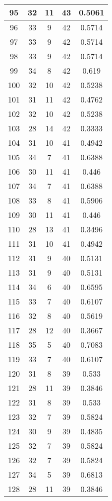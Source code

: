 \documentclass[letterpaper, 12pt]{article}
\begin{document}
\begin{longtable}{|c|c|c|c|c|}
\hline
95 & 32 & 11 & 43 & 0.5061 \\
\hline
96 & 33 & 9 & 42 & 0.5714 \\
\hline
97 & 33 & 9 & 42 & 0.5714 \\
\hline
98 & 33 & 9 & 42 & 0.5714 \\
\hline
99 & 34 & 8 & 42 & 0.619 \\
\hline
100 & 32 & 10 & 42 & 0.5238 \\
\hline
101 & 31 & 11 & 42 & 0.4762 \\
\hline
102 & 32 & 10 & 42 & 0.5238 \\
\hline
103 & 28 & 14 & 42 & 0.3333 \\
\hline
104 & 31 & 10 & 41 & 0.4942 \\
\hline
105 & 34 & 7 & 41 & 0.6388 \\
\hline
106 & 30 & 11 & 41 & 0.446 \\
\hline
107 & 34 & 7 & 41 & 0.6388 \\
\hline
108 & 33 & 8 & 41 & 0.5906 \\
\hline
109 & 30 & 11 & 41 & 0.446 \\
\hline
110 & 28 & 13 & 41 & 0.3496 \\
\hline
111 & 31 & 10 & 41 & 0.4942 \\
\hline
112 & 31 & 9 & 40 & 0.5131 \\
\hline
113 & 31 & 9 & 40 & 0.5131 \\
\hline
114 & 34 & 6 & 40 & 0.6595 \\
\hline
115 & 33 & 7 & 40 & 0.6107 \\
\hline
116 & 32 & 8 & 40 & 0.5619 \\
\hline
117 & 28 & 12 & 40 & 0.3667 \\
\hline
118 & 35 & 5 & 40 & 0.7083 \\
\hline
119 & 33 & 7 & 40 & 0.6107 \\
\hline
120 & 31 & 8 & 39 & 0.533 \\
\hline
121 & 28 & 11 & 39 & 0.3846 \\
\hline
122 & 31 & 8 & 39 & 0.533 \\
\hline
123 & 32 & 7 & 39 & 0.5824 \\
\hline
124 & 30 & 9 & 39 & 0.4835 \\
\hline
125 & 32 & 7 & 39 & 0.5824 \\
\hline
126 & 32 & 7 & 39 & 0.5824 \\
\hline
127 & 34 & 5 & 39 & 0.6813 \\
\hline
128 & 28 & 11 & 39 & 0.3846 \\

\end{longtable}
\end{document}
